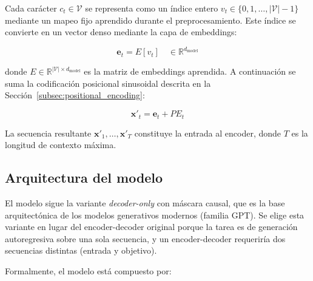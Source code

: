 Cada carácter $c_t \in \mathcal{V}$ se representa como un índice entero
$v_t \in \{0, 1, \ldots, |\mathcal{V}|-1\}$ mediante un mapeo fijo
aprendido durante el preprocesamiento. Este índice se convierte en un
vector denso mediante la capa de embeddings:

\begin{equation}
    \bm{e}_t = E[v_t] \quad \in \mathbb{R}^{d_{\text{model}}}
\end{equation}

\noindent donde $E \in \mathbb{R}^{|\mathcal{V}| \times d_{\text{model}}}$
es la matriz de embeddings aprendida. A continuación se suma la
codificación posicional sinusoidal descrita en la
Sección~\ref{subsec:positional_encoding}:

\begin{equation}
    \bm{x}'_t = \bm{e}_t + PE_t
\end{equation}

La secuencia resultante $\bm{x}'_1, \ldots, \bm{x}'_T$ constituye la
entrada al encoder, donde $T$ es la longitud de contexto máxima.

\subsection{Arquitectura del modelo}
\label{subsec:arq_modelo}

El modelo sigue la variante \textit{decoder-only} con máscara causal,
que es la base arquitectónica de los modelos generativos modernos
(familia GPT). Se elige esta variante en lugar del encoder-decoder
original porque la tarea es de generación autoregresiva sobre una sola
secuencia, y un encoder-decoder requeriría dos secuencias distintas
(entrada y objetivo).

Formalmente, el modelo está compuesto por:

